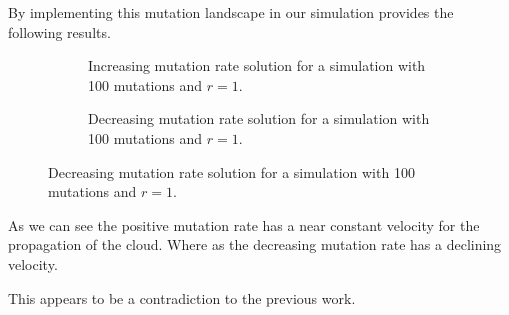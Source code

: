 \documentclass{standalone}
\begin{document}
By implementing this mutation landscape in our simulation provides the following results.

\begin{figure}[H]
	\begin{subfigure}[h]{0.5\textwidth}
			
		\caption{Increasing mutation rate solution for a simulation with 100 mutations and $r=1$.}
	\end{subfigure}
	\begin{subfigure}[h]{0.5\textwidth}
		
	\caption{Decreasing mutation rate solution for a simulation with 100 mutations and $r=1$.}
	\end{subfigure}
\end{figure}

As we can see the positive mutation rate has a near constant velocity for the propagation of the cloud. Where as the decreasing mutation rate has a declining velocity. 

This appears to be a contradiction to the previous work.
\end{document}
